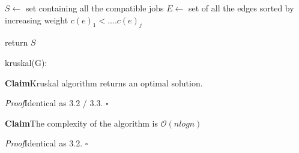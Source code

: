 \documentclass[11pt]{article}
\newenvironment{claim}[1]{\par\textbf{Claim}\space#1}{}
\newenvironment{proof}[1]{\par\textit{Proof}\space#1}{\hfill\ensuremath{\square}}
\begin{document}
\begin{algorithm}[H]
\SetAlgoLined
\small
{}
\BlankLine

$S \leftarrow$ set containing all the compatible jobs\;
$E \leftarrow$ set of all the edges sorted by increasing weight $c(e)_{1} < .... c(e)_{j}$

\BlankLine


\BlankLine

return $S$\;
\caption{kruskal(G):}
\end{algorithm}

\begin{claim}
Kruskal algorithm returns an optimal solution.
\end{claim}
\begin{proof}
Identical as 3.2 / 3.3.
\end{proof}\\
 
\begin{claim}
The complexity of the algorithm is $\mathcal{O}{(nlogn)}$
\end{claim}
\begin{proof}
Identical as 3.2.
\end{proof}\\
\end{document}
